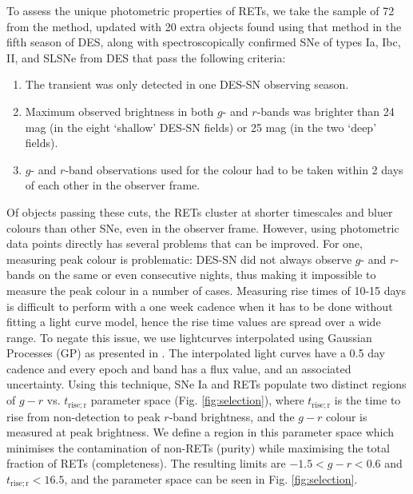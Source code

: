 \documentclass[fleqn,usenatbib,]{mnras}
\begin{document}
To assess the unique photometric properties of RETs, we take the sample of 72 from the  method, updated with 20 extra objects found using that method in the fifth season of DES, along with spectroscopically confirmed SNe of types Ia, Ibc, II, and SLSNe from DES that pass the following criteria:
\begin{enumerate}
\item The transient was only detected in one DES-SN observing season.
\item Maximum observed brightness in both $g$- and $r$-bands was brighter than 24 mag (in the eight `shallow' DES-SN fields) or 25 mag (in the two `deep' fields).
\item $g$- and $r$-band observations used for the colour had to be taken within 2 days of each other in the observer frame.
\end{enumerate}

Of objects passing these cuts, the RETs cluster at shorter timescales and bluer colours than other SNe, even in the observer frame. However, using photometric data points directly has several problems that can be improved. For one, measuring peak colour is problematic: DES-SN did not always observe $g$- and $r$-bands on the same or even consecutive nights, thus making it impossible to measure the peak colour in a number of cases. Measuring rise times of 10-15 days is difficult to perform with a one week cadence when it has to be done without fitting a light curve model, hence the rise time values are spread over a wide range. To negate this issue, we use lightcurves interpolated using Gaussian Processes (GP) as presented in \citet{Pursiainen2020}. The interpolated light curves have a 0.5 day cadence and every epoch and band has a flux value, and an associated uncertainty. Using this technique, SNe Ia and RETs populate two distinct regions of $g-r$ vs. $t_{\mathrm{rise; r}}$ parameter space (Fig. \ref{fig:selection}), where $t_{\mathrm{rise; r}}$ is the time to rise from non-detection to peak $r$-band brightness, and the $g-r$ colour is measured at peak brightness. We define a region in this parameter space which minimises the contamination of non-RETs (purity) while maximising the total fraction of RETs (completeness). The resulting limits are $-1.5 < g-r < 0.6 $ and $t_{\mathrm{rise; r}} <16.5$, and the parameter space can be seen in Fig. \ref{fig:selection}.
\end{document}
